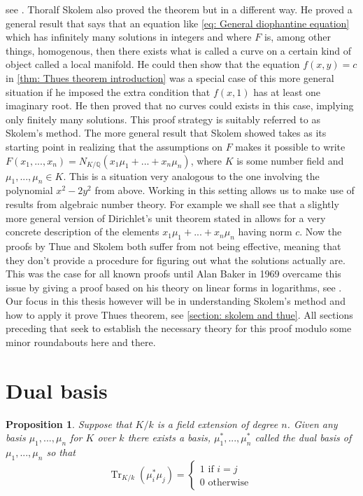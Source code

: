 \documentclass{article}
\DeclareMathOperator{\tr}{Tr}
\newtheorem{proposition}{Proposition}[section]
\newcommand{\mbb}[1]{\mathbb{#1}}
\numberwithin{equation}{section}
\begin{document}
see \citep{thuewikipedia}. Thoralf Skolem also proved the theorem but in a different way. He proved a general result that says that an equation like \cref{eq: General diophantine equation} which has infinitely many solutions in integers and where $F$ is, among other things, homogenous, then there exists what is called a curve on a certain kind of object called a local manifold. He could then show that the equation $f(x,y) = c$ in \cref{thm: Thues theorem introduction} was a special case of this more general situation if he imposed the extra condition that $f(x,1)$ has at least one imaginary root. He then proved that no curves could exists in this case, implying only finitely many solutions. This proof strategy is suitably referred to as Skolem's method. The more general result that Skolem showed takes as its starting point in realizing that the assumptions on $F$ makes it possible to write $F(x_1, ..., x_n) = N_{K/\mbb Q}{(x_1\mu_1 + ... + x_n \mu_n)}$, where $K$ is some number field and $\mu_1, ..., \mu_n \in K$. This is a situation very analogous to the one involving the polynomial $x^2 - 2y^2$ from above. Working in this setting allows us to make use of results from algebraic number theory. For example we shall see that a slightly more general version of Dirichlet's unit theorem stated in \citep[Theorem 38]{marcus} allows for a very concrete description of the elements $x_1\mu_1 + ... + x_n \mu_n$  having norm $c$. Now the proofs by Thue and Skolem both suffer from not being effective, meaning that they don't provide a procedure for figuring out what the solutions actually are. This was the case for all known proofs until Alan Baker in 1969 overcame this issue by giving a proof based on his theory on linear forms in logarithms, see \citep[Theorem 4.1]{baker}. Our focus in this thesis however will be in understanding Skolem's method and how to apply it prove Thues theorem, see \cref{section: skolem and thue}. All sections preceding that seek to establish the necessary theory for this proof modulo some minor roundabouts here and there.
\section{Dual basis}
\begin{proposition}\label{prop: Existence of dual basis}
    Suppose that $K/k$ is a field extension of degree $n$. Given any basis $\mu_1, ..., \mu_n$ for $K$ over $k$ there exists a basis, $\mu_1^*, ..., \mu_n^*$ called the dual basis of $\mu_1, ..., \mu_n$ so that
    $$\tr_{K/k}(\mu_i^* \mu_j) = \begin{cases*}
            1 \text{ if } i = j \\
            0 \text{ otherwise }
        \end{cases*}$$
\end{proposition}
\end{document}
